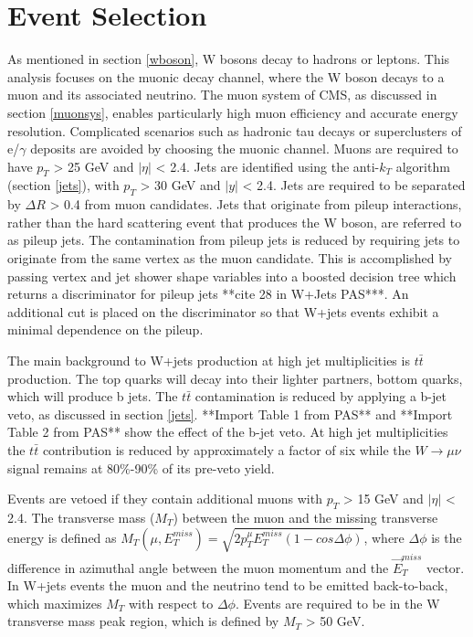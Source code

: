 \documentclass[oneside, letterpaper, oldfontcommands]{memoir}
\begin{document}
{{{\section{Event Selection}
\qquad As mentioned in section \ref{wboson}, W bosons decay to hadrons or leptons. This analysis focuses on the muonic decay channel, where the W boson decays to a muon and its associated neutrino. The muon system of CMS, as discussed in section \ref{muonsys}, enables particularly high muon efficiency and accurate energy resolution. Complicated scenarios such as hadronic tau decays or superclusters of e/$\gamma$ deposits are avoided by choosing the muonic channel. Muons are required to have $p_{T}$ > 25 GeV and $|\eta|$ < 2.4. Jets are identified using the anti-$k_{T}$ algorithm (section \ref{jets}), with $p_{T}$ > 30 GeV and $|y|$ < 2.4. Jets are required to be separated by $\Delta R$ > 0.4 from muon candidates. Jets that originate from pileup interactions, rather than the hard scattering event that produces the W boson, are referred to as pileup jets. The contamination from pileup jets is reduced by requiring jets to originate from the same vertex as the muon candidate. This is accomplished by passing vertex and jet shower shape variables into a boosted decision tree which returns a discriminator for pileup jets **cite 28 in W+Jets PAS***. An additional cut is placed on the discriminator so that W+jets events exhibit a minimal dependence on the pileup.

\qquad The main background to W+jets production at high jet multiplicities is $t\bar{t}$ production. The top quarks will decay into their lighter partners, bottom quarks, which will produce b jets. The $t\bar{t}$ contamination is reduced by applying a b-jet veto, as discussed in section \ref{jets}. **Import Table 1 from PAS** and **Import Table 2 from PAS** show the effect of the b-jet veto. At high jet multiplicities the $t\bar{t}$ contribution is reduced by approximately a factor of six while the $W \rightarrow \mu\nu$ signal remains at 80\%-90\% of its pre-veto yield.

\qquad Events are vetoed if they contain additional muons with $p_{T}$ > 15 GeV and $|\eta|$ < 2.4. The transverse mass ($M_{T}$) between the muon and the missing transverse energy is defined as $M_{T}(\mu,E_{T}^{miss}) = \sqrt{2 p_{T}^{\mu} E_{T}^{miss} (1-cos\Delta\phi)}$, where $\Delta\phi$ is the difference in azimuthal angle between the muon momentum and the $\vec{E}_{T}^{miss}$ vector. In W+jets events the muon and the neutrino tend to be emitted back-to-back, which maximizes $M_{T}$ with respect to $\Delta\phi$. Events are required to be in the W transverse mass peak region, which is defined by $M_{T}$ > 50 GeV.

}}}
\end{document}
